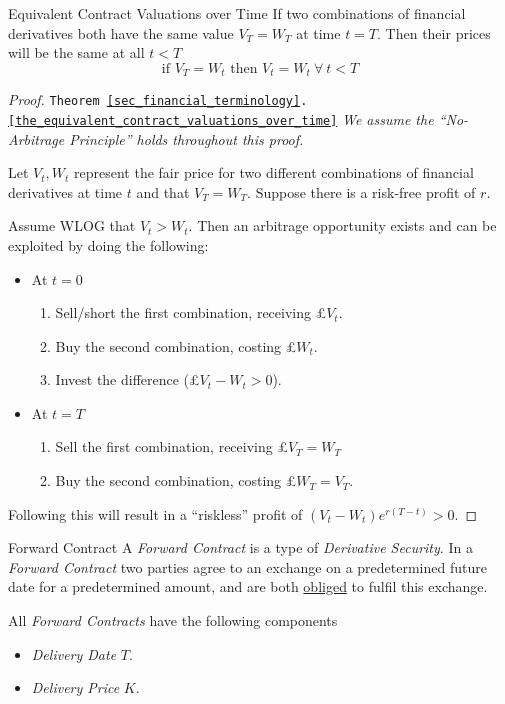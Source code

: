 \documentclass[11pt,a4paper]{article}
\begin{document}
  \begin{theorem}{Equivalent Contract Valuations over Time}\label{the_equivalent_contract_valuations_over_time}
    If two combinations of financial derivatives both have the same value $V_T=W_T$ at time $t=T$. Then their prices will be the same at all $t<T$
    \[ \text{if }V_T=W_t\text{ then }V_t=W_t\ \forall\ t<T \]
  \end{theorem}

  \begin{proof}{\texttt{Theorem \ref{sec_financial_terminology}.\ref{the_equivalent_contract_valuations_over_time}} }
    \textit{We assume the ``No-Arbitrage Principle'' holds throughout this proof.}
    \par Let $V_t,W_t$ represent the fair price for two different combinations of financial derivatives at time $t$ and that $V_T=W_T$. Suppose there is a risk-free profit of $r$.
    \par Assume WLOG that $V_t>W_t$. Then an arbitrage opportunity exists and can be exploited by doing the following:
    \begin{itemize}
      \item At $t=0$
      \begin{enumerate}
        \item Sell/short the first combination, receiving £$V_t$.
        \item Buy the second combination, costing £$W_t$.
        \item Invest the difference (£$V_t-W_t>0$).
      \end{enumerate}
      \item At $t=T$
      \begin{enumerate}
        \item Sell the first combination, receiving £$V_T=W_T$
        \item Buy the second combination, costing £$W_T=V_T$.
      \end{enumerate}
    \end{itemize}
    Following this will result in a ``riskless'' profit of $(V_t-W_t)e^{r(T-t)}>0$.
  \end{proof}

  \begin{definition}{Forward Contract}
    A \textit{Forward Contract} is a type of \textit{Derivative Security}. In a \textit{Forward Contract} two parties agree to an exchange on a predetermined future date for a predetermined amount, and are both \underline{obliged} to fulfil this exchange.
    \par All \textit{Forward Contracts} have the following components
    \begin{itemize}
      \item \textit{Delivery Date} $T$.
      \item \textit{Delivery Price} $K$.
    \end{itemize}
  \end{definition}
\end{document}
